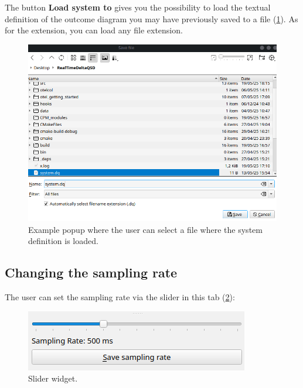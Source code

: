     The button \textbf{Load system to} gives you the possibility to load the textual definition of the outcome diagram you may have previously saved to a file (\cref{fig:loadsys}). As for the extension, you can load any file extension.

    
    \begin{figure}[H]
        \begin{center}
            \includegraphics[width = \textwidth]{img/save_system.png}
        \end{center}
        \caption{Example popup where the user can select a file where the system definition is loaded.}
        \label{fig:loadsys}
    \end{figure}
        
\subsection{Changing the sampling rate}
    The user can set the sampling rate via the slider in this tab (\cref{fig:slid_wid}):
 \begin{figure}[H]
        \begin{center}
            \includegraphics[width = \textwidth]{img/manual/modify_sampling.png}
        \end{center}
        \caption{Slider widget.}
        \label{fig:slid_wid}
    \end{figure}

